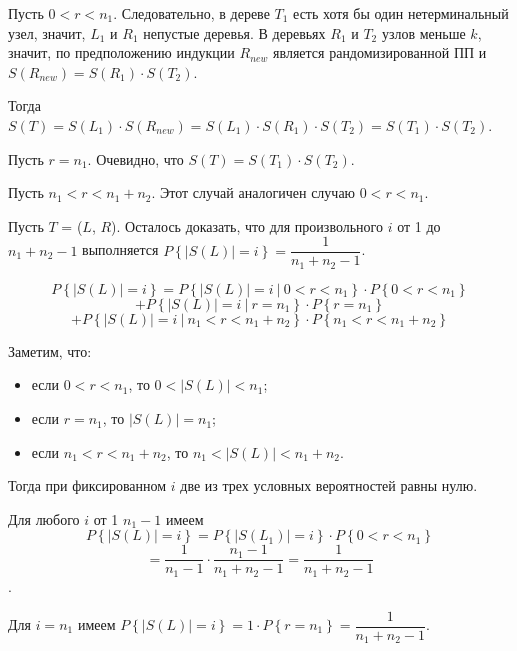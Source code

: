 \documentclass[14pt]{article}
\begin{document}
\begin{enumerate}
	\begin{item}
		Пусть $0 < r < n_1$. Следовательно, в дереве $T_1$ есть
		хотя бы один нетерминальный узел, значит, $L_1$ и $R_1$ непустые деревья.
		В деревьях $R_1$ и $T_2$ узлов меньше $k$, значит, по
		предположению индукции $R_{new}$ является рандомизированной ПП и $S(R_{new}) = S(R_1) \cdot S(T_2)$.

		Тогда $S(T) = S(L_1) \cdot S(R_{new}) = S(L_1) \cdot S(R_1) \cdot S(T_2) = S(T_1) \cdot S(T_2)$.
	\end{item}
	\begin{item}
		Пусть $r = n_1$. Очевидно, что $S(T) = S(T_1) \cdot S(T_2)$.
	\end{item}
	\begin{item}
		Пусть $n_1 < r < n_1 + n_2$. Этот случай аналогичен случаю $0 < r < n_1$.
	\end{item}
\end{enumerate}

Пусть $T$ = ($L$, $R$). Осталось доказать, что для произвольного $i$ от 1 до $n_1+n_2-1$ выполняется 
$P\left\{\left|S(L)\right| = i\right\} = \dfrac{1}{n_1+n_2-1}$.

$$P\left\{\left|S(L)\right| = i\right\} = P\left\{\left|S(L)\right| = i~|~0 < r < n_1\right\} \cdot P\left\{0 < r < n_1\right\} $$
$$+ P\left\{\left|S(L)\right| = i~|~r = n_1\right\} \cdot P\left\{r = n_1\right\}$$
$$+ P\left\{\left|S(L)\right| = i~|~n_1 < r < n_1 + n_2\right\} \cdot P\left\{n_1 < r < n_1 + n_2\right\}$$

Заметим, что: 
\begin{itemize}
	\item если $0 < r < n_1$, то $0 < \left|S(L)\right| < n_1$;
	\item если $r = n_1$, то $\left|S(L)\right| = n_1$;
	\item если $n_1 < r < n_1 + n_2$, то $n_1 < \left|S(L)\right| < n_1 + n_2$.
\end{itemize}

Тогда при фиксированном $i$ две из трех условных вероятностей равны нулю.

Для любого $i$ от 1 $n_1-1$ имеем 
$$P\left\{\left|S(L)\right| = i\right\} = P\left\{\left|S(L_1)\right| = i\right\}\cdot P\left\{0 < r < n_1\right\} $$
$$ = \dfrac{1}{n_1-1}\cdot\dfrac{n_1-1}{n_1+n_2-1} = \dfrac{1}{n_1+n_2-1}$$.
									
Для $i = n_1$ имеем $P\left\{\left|S(L)\right| = i\right\} 
				= 1 \cdot P\left\{r = n_1\right\} = \dfrac{1}{n_1+n_2-1}$.
				
\end{document}
